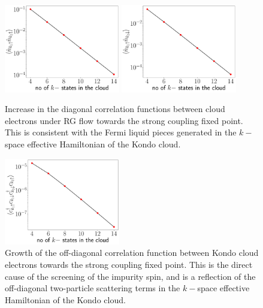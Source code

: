 \begin{figure}[!htbp]
	\centering
	\includegraphics[width=0.45\textwidth]{../figures/corr_same.pdf}
	\includegraphics[width=0.45\textwidth]{../figures/corr_opp.pdf}
	\caption{Increase in the diagonal correlation functions between cloud electrons under RG flow towards the strong coupling fixed point. This is consistent with the Fermi liquid pieces generated in the \(k-\)space effective Hamiltonian of the Kondo cloud.}
\end{figure}

\begin{figure}[!htbp]
	\centering
	\includegraphics[width=0.45\textwidth]{../figures/corr_od.pdf}
	\caption{Growth of the off-diagonal correlation function between Kondo cloud electrons towards the strong coupling fixed point. This is the direct cause of the screening of the impurity spin, and is a reflection of the off-diagonal two-particle scattering terms in the \(k-\)space effective Hamiltonian of the Kondo cloud.}
\end{figure}

